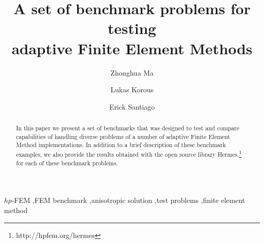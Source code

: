 \begin{frontmatter}

\title{A set of benchmark problems for testing\\ adaptive Finite Element Methods}

\author[label1]{Zhonghua Ma}
\author[label2]{Lukas Korous}
\author[label3]{Erick Santiago}
\address[label1]{China University of Petroleum, Beijing, China}
\address[label2]{Charles University, Prague, Czech Republic}
\address[label3]{University of Nevada, Reno, USA}

\begin{abstract}
In this paper we present a set of benchmarks that was designed to
test and compare capabilities of handling diverse problems of a number
of adaptive Finite Element Method implementations. In addition 
to a brief description of these benchmark examples, we also provide 
the results obtained with the open source library {\sc Hermes}.\footnote{http://hpfem.org/hermes} for each of
these benchmark problems.
\end{abstract}

\begin{keyword}
$hp$-FEM \sep FEM benchmark \sep anisotropic solution \sep test problems \sep finite element method
\end{keyword}

\end{frontmatter}
